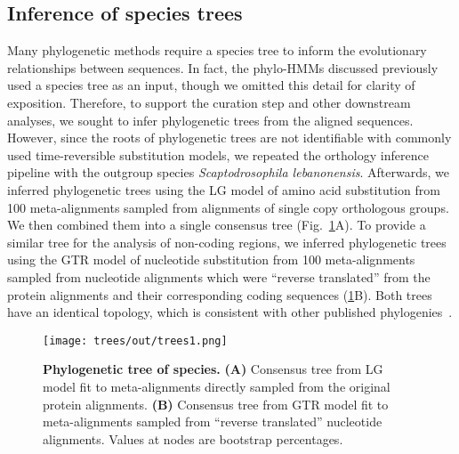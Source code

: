 \subsection{Inference of species trees}
Many phylogenetic methods require a species tree to inform the evolutionary relationships between sequences. In fact, the phylo-HMMs discussed previously used a species tree as an input, though we omitted this detail for clarity of exposition. Therefore, to support the curation step and other downstream analyses, we sought to infer phylogenetic trees from the aligned sequences. However, since the roots of phylogenetic trees are not identifiable with commonly used time-reversible substitution models, we repeated the orthology inference pipeline with the outgroup species \textit{Scaptodrosophila lebanonensis}. Afterwards, we inferred phylogenetic trees using the LG model of amino acid substitution from 100 meta-alignments sampled from alignments of single copy orthologous groups. We then combined them into a single consensus tree (Fig.~\ref{fig:trees}A). To provide a similar tree for the analysis of non-coding regions, we inferred phylogenetic trees using the GTR model of nucleotide substitution from 100 meta-alignments sampled from nucleotide alignments which were ``reverse translated'' from the protein alignments and their corresponding coding sequences (\ref{fig:trees}B). Both trees have an identical topology, which is consistent with other published phylogenies~\cite{D12GC2007, DaLage2007}.

\begin{figure}[h!]
\texttt{[image: trees/out/trees1.png]}
\centering
\caption{\textbf{Phylogenetic tree of species.}
\textbf{(A)} Consensus tree from LG model fit to meta-alignments directly sampled from the original protein alignments. \textbf{(B)} Consensus tree from GTR model fit to meta-alignments sampled from ``reverse translated'' nucleotide alignments. Values at nodes are bootstrap percentages.}
\label{fig:trees}
\end{figure}

